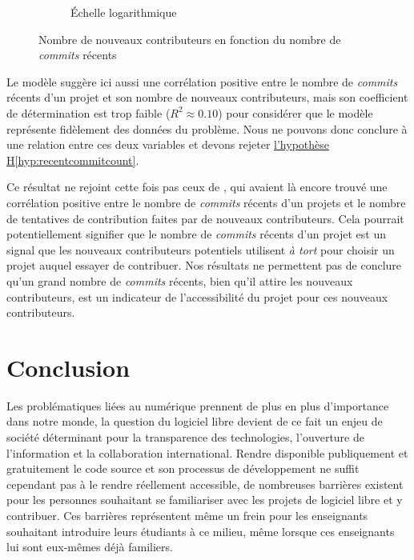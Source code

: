 \documentclass[dvipsnames]{llncs}
\newcommand{\en}[1]{\foreignlanguage{english}{\emph{#1}}}
\begin{document}
\begin{figure}[ht]
\begin{subfigure}[t]{0.5\textwidth}
            \caption{Échelle logarithmique}
        \end{subfigure}

        

        

        \caption{Nombre de nouveaux contributeurs en fonction du nombre de \emph{commits} récents}
        \label{fig:commitCount}
    \end{figure}

    Le modèle suggère ici aussi une corrélation positive entre le nombre de \en{commits} récents d'un projet
    et son nombre de nouveaux contributeurs, mais son coefficient de détermination est trop faible ($R^2
    \approx 0.10$) pour considérer que le modèle représente fidèlement des données du problème. Nous ne
    pouvons donc conclure à une relation entre ces deux variables et devons rejeter
    \hyperref[hyp:recentcommitcount]{l'hypothèse H\ref*{hyp:recentcommitcount}}.

    Ce résultat ne rejoint cette fois pas ceux de \textcite[p.~13,16]{signals-2019}, qui avaient là encore
    trouvé une corrélation positive entre le nombre de \en{commits} récents d'un projets et le nombre de
    tentatives de contribution faites par de nouveaux contributeurs. Cela pourrait potentiellement signifier
    que le nombre de \en{commits} récents d'un projet est un signal que les nouveaux contributeurs potentiels
    utilisent \emph{à tort} pour choisir un projet auquel essayer de contribuer. Nos résultats ne permettent
    pas de conclure qu'un grand nombre de \en{commits} récents, bien qu'il attire les nouveaux contributeurs,
    est un indicateur de l'accessibilité du projet pour ces nouveaux contributeurs.

    \section{Conclusion}

    Les problématiques liées au numérique prennent de plus en plus d'importance dans notre monde, la question
    du logiciel libre devient de ce fait un enjeu de société déterminant pour la transparence des
    technologies, l'ouverture de l'information et la collaboration international. Rendre disponible
    publiquement et gratuitement le code source et son processus de développement ne suffit cependant pas à le
    rendre réellement accessible, de nombreuses barrières existent pour les personnes souhaitant se
    familiariser avec les projets de logiciel libre et y contribuer. Ces barrières représentent même un frein
    pour les enseignants souhaitant introduire leurs étudiants à ce milieu, même lorsque ces enseignants lui
    sont eux-mêmes déjà familiers.
\end{document}
